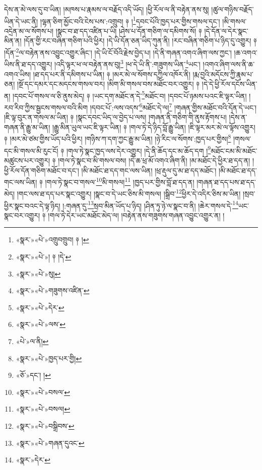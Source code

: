 དེས་ན་མེ་ལས་དུ་བ་ཡིན། །མཁས་པ་རྣམས་ལ་བརྗོད་འདི་ཡོད། །ཕྱི་རོལ་ལ་ནི་བརྟེན་ནས་སུ། །ཚུལ་གཉིས་བརྗོད་ཡིན་དེ་ཡང་ནི། །ལྷན་ཅིག་མྱོང་བའི་ངེས་པས་:འགྲུབ། ༈ །\footnote{«སྣར་»«པེ་»འགྲུབགྲུབ། ༈ །}དབང་པོའི་ཁྱད་པར་གྱིས་གསལ་དང་། །མི་གསལ་འདྲེན་མ་ལ་སོགས་པ། །སྣང་བ་ཐ་དད་འཛིན་པ་ཡི། །ཤེས་པ་དོན་གཅིག་ལ་དམིགས་སོ། ༈ །དེ་དོན་ལ་དེར་སྣང་མིན་ན། །དོན་གྱི་རང་བཞིན་གཅིག་པའི་ཕྱིར། །དེ་ཡི་དོན་ཅན་ཡིད་ཀུན་ནི། །རང་བཞིན་གཅིག་པ་ཉིད་དུ་འགྱུར། ༈ །དོན་\footnote{«སྣར་»«པེ་»། ༈ །དེ་}ལ་བརྟེན་ནས་འབྱུང་འགྱུར་ཞིང་། །དེ་ཡི་ངོ་བོའི་རྗེས་བྱེད་པ། །དེ་ནི་གཞན་འགའ་ཞིག་ལས་ཀྱང་། །ཆ་འགའ་ཡིས་ནི་ཐ་དད་འགྱུར། །འདི་ལྟར་ཕ་ལ་བརྟེན་ནས་བུ།\footnote{«སྣར་»«པེ་»སུ།} །ཕ་དེ་ཡི་ནི་:གཟུགས་ཡིན་\footnote{«སྣར་»«པེ་»གཟུགས་འཛིན་}ཡང་། །འགའ་ཞིག་ལས་ནི་ཆ་འགའ་ཡིས། །ཐ་དད་པར་ནི་དམིགས་པ་ཡིན། ༈ །མར་མེ་ལ་སོགས་དཀྱིལ་འཁོར་ནི། །རྨ་བྱའི་མདོངས་ཀྱི་རྣམ་པ་ཅན། །སྔོ་དང་དམར་དང་མདངས་གསལ་བར། །མིག་མི་གསལ་བས་མཐོང་བར་འགྱུར། ༈ །དེ་དེ་ཕྱི་རོལ་དངོས་ཡིན་ན། །དབང་པོ་གསལ་ལ་ཅི་ནུས་མེད། ༈ །ཡང་དག་མཐོང་ན་དེ་\footnote{«སྣར་»«པེ་»དེར་}མཐོང་བ། །དབང་པོ་ཉམས་པའང་ཇི་ལྟར་ཡིན། །རབ་རིབ་ཀྱིས་སྦྱངས་གསལ་བའི་མིག །དབང་པོ་:ལས་འདས་\footnote{«སྣར་»«པེ་»ལས་}མཐོང་དེ་ལ།\footnote{«པེ་»ལ་ནི།} །གཞན་གྱིས་མཐོང་བའི་དོན་དེ་ཡང་། །ཇི་ལྟ་བུར་ན་གསལ་མ་ཡིན། ༈ །སྣང་དབང་ཡིད་ལ་བྱེད་པ་ལས། །གཞན་ནི་གཅིག་གི་ནུས་རྟོགས་པ། །དེས་ན་གཞན་ནི་རྒྱུ་མ་ཡིན། །རྒྱུ་མིན་ཡུལ་ཡང་ཇི་ལྟར་ཡིན། ༈ །གལ་ཏེ་དེ་ཉིད་བློ་རྒྱུ་ཡིན། །ཇི་ལྟར་མར་མེ་ལ་ལྟོས་འགྱུར། ༈ །མར་མེ་ཙམ་གྱིས་ཡོད་པའི་ཕྱིར། །གཉིས་ཀ་དག་ཀྱང་རྒྱུ་མ་ཡིན། །ཉེ་རིང་ལ་སོགས་:ཁྱད་པར་གྱིས།\footnote{«སྣར་»«པེ་»ཁྱད་པར་གྱི།} །གསལ་དང་མི་གསལ་མི་རུང་ངོ། ༈ །གལ་ཏེ་སྣང་ཁྱད་ལས་དེར་འགྱུར། །དེ་ནི་ཆོད་དང་མ་ཆོད་དག །\footnote{«ཅོ་»དང་། །}མཐོང་ངམ་མི་མཐོང་མཚུངས་པར་འགྱུར། ༈ །གལ་ཏེ་སྣང་བ་མི་གསལ་བས། །དེ་ཆ་ཕྲ་མོ་འགའ་ཞིག་ནི། །མ་མཐོང་དེ་ཕྱིར་ཐ་དད་ན། །ཕྱི་རོལ་དོན་གཅིག་མཐོང་བ་དང་། །མི་མཐོང་ཐ་དད་གང་ལས་ཡིན། །ཕྲ་རྡུལ་དུ་མ་ཐ་དད་མཐོང་། །མི་མཐོང་ཐ་དད་གང་ལས་ཡིན། ༈ །གལ་ཏེ་སྣང་བ་གསལ་\footnote{«སྣར་»«པེ་»བསལ་}མི་གསལ།\footnote{«སྣར་»«པེ་»བསལ།} །ཁྱད་པར་གྱིས་བློ་ཐ་དད་ན། །གཞན་ཐ་དད་པས་ཐ་དད་མེད། །གང་ལས་ཐ་དད་པར་སྣང་འགྱུར། །སྣང་བ་དེ་ཡང་ཅིས་མི་གསལ། །སྒྲིབ་\footnote{«སྣར་»«པེ་»བསྒྲིབས་}ཕྱིར་དེ་འདིར་ཅིས་མ་ཡིན། །སྲབ་ཕྱིར་སྣང་བའང་དེ་ལྟ་ཉིད། །:གཞན་དུ་\footnote{«སྣར་»«པེ་»གཞན་དུའང་}སྲབ་མིན་ཡོད་པ་ཉིད། །ཤིན་ཏུ་ཉེ་ལ་སྣང་བ་ནི། །ཆེར་གསལ་དེ་\footnote{«སྣར་»དེར་}ཡང་སྣང་བར་འགྱུར། ༈ །གལ་ཏེ་དེར་ཡང་མཐོང་མེད་ལ། །བརྟེན་ནས་གཟུགས་གཞན་འབྱུང་འགྱུར་ན། །
